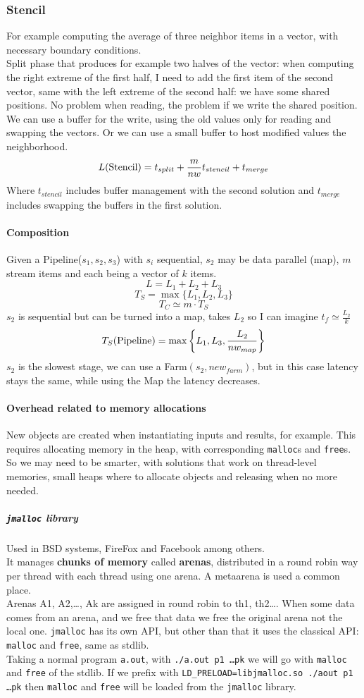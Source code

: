 \documentclass[10pt]{report}
\begin{document}
\subsubsection{Stencil}
For example computing the average of three neighbor items in a vector, with necessary boundary conditions.\\
Split phase that produces for example two halves of the vector: when computing the right extreme of the first half, I need to add the first item of the second vector, same with the left extreme of the second half: we have some shared positions. No problem when reading, the problem if we write the shared position. We can use a buffer for the write, using the old values only for reading and swapping the vectors. Or we can use a small buffer to host modified values the neighborhood.
$$L(\hbox{Stencil}) = t_{split} + \frac{m}{nw}t_{stencil} +t_{merge}$$
Where $t_{stencil}$ includes buffer management with the second solution and $t_{merge}$ includes swapping the buffers in the first solution.
\paragraph{Composition} Given a Pipeline($s_1,s_2,s_3$) with $s_i$ sequential, $s_2$ may be data parallel (map), $m$ stream items and each being a vector of $k$ items.
$$L = L_1+L_2+L_3$$
$$T_S=\max\{L_1,L_2,L_3\}$$
$$T_C\simeq m\cdot T_S$$
$s_2$ is sequential but can be turned into a map, takes $L_2$ so I can imagine $t_f \simeq \frac{L_2}{k}$
$$T_S(\hbox{Pipeline}) = \max\left\{L_1,L_3,\frac{L_2}{nw_{map}}\right\}$$
$s_2$ is the slowest stage, we can use a Farm$(s_2, new_{farm})$, but in this case latency stays the same, while using the Map the latency decreases.
\paragraph{Overhead related to memory allocations} New objects are created when instantiating inputs and results, for example. This requires allocating memory in the heap, with corresponding \texttt{malloc}s and \texttt{free}s. So we may need to be smarter, with solutions that work on thread-level memories, small heaps where to allocate objects and releasing when no more needed.
\subparagraph{\texttt{jmalloc} library} Used in BSD systems, FireFox and Facebook among others.\\
It manages \textbf{chunks of memory} called \textbf{arenas}, distributed in a round robin way per thread with each thread using one arena. A metaarena is used a common place.\\
Arenas A1, A2,\ldots, Ak are assigned in round robin to th1, th2\ldots. When some data comes from an arena, and we free that data we free the original arena not the local one. \texttt{jmalloc} has its own API, but other than that it uses the classical API: \texttt{malloc} and \texttt{free}, same as stdlib.\\
Taking a normal program \texttt{a.out}, with \texttt{./a.out p1 \ldots pk} we will go with \texttt{malloc} and \texttt{free} of the stdlib. If we prefix with \texttt{LD\_PRELOAD=libjmalloc.so ./aout p1 \ldots pk} then \texttt{malloc} and \texttt{free} will be loaded from the \texttt{jmalloc} library.
\end{document}
